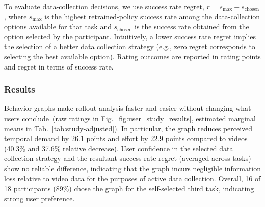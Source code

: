 \documentclass[letterpaper, 10 pt, conference]{ieeeconf}
\begin{document}
To evaluate data-collection decisions, we use success rate regret, \(r = s_{\max} - s_{\text{chosen}}\), where \(s_{\max}\) is the highest retrained-policy success rate among the data-collection options available for that task and \(s_{\text{chosen}}\) is the success rate obtained from the option selected by the participant. Intuitively, a lower success rate regret implies the selection of a better data collection strategy (e.g., zero regret corresponds to selecting the best available option). Rating outcomes are reported in rating points and regret in terms of success rate.

\subsubsection{Results}

Behavior graphs make rollout analysis faster and easier without changing what users conclude~(raw ratings in Fig.~\ref{fig:user_study_results}, estimated marginal means in Tab.~\ref{tab:study-adjusted}). 
In particular, the graph reduces perceived temporal demand by 26.1 points and effort by 22.9 points compared to videos (40.3\% and 37.6\% relative decrease).  
User confidence in the selected data collection strategy and the resultant success rate regret (averaged across tasks) show no reliable difference, indicating that the graph incurs negligible information loss relative to video data for the purposes of active data collection.
Overall, 16 of 18 participants (89\%) chose the graph for the self-selected third task, indicating strong user preference. 


\end{document}
